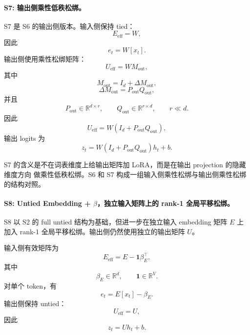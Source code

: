 \paragraph{S7: 输出侧乘性低秩松绑。}
S7 是 S6 的输出侧版本。输入侧保持 tied：
\begin{equation}
    E_{\mathrm{eff}} = W,
\end{equation}
因此
\begin{equation}
    e_t = W[x_t].
\end{equation}
输出侧使用乘性松绑矩阵：
\begin{equation}
    U_{\mathrm{eff}} = W M_{\mathrm{out}},
\end{equation}
其中
\begin{equation}
    M_{\mathrm{out}} = I_d + \Delta M_{\mathrm{out}},
\end{equation}
\begin{equation}
    \Delta M_{\mathrm{out}} = P_{\mathrm{out}}Q_{\mathrm{out}},
\end{equation}
并且
\begin{equation}
    P_{\mathrm{out}} \in \mathbb{R}^{d \times r}, \qquad
    Q_{\mathrm{out}} \in \mathbb{R}^{r \times d}, \qquad
    r \ll d.
\end{equation}
因此
\begin{equation}
    U_{\mathrm{eff}} =
    W(I_d + P_{\mathrm{out}}Q_{\mathrm{out}}),
\end{equation}
输出 logits 为
\begin{equation}
    z_t =
    W(I_d + P_{\mathrm{out}}Q_{\mathrm{out}})h_t + b.
\end{equation}

S7 的含义是不在词表维度上给输出矩阵加 LoRA，而是在输出 projection 的隐藏维度方向
做乘性低秩松绑。S6 和 S7 构成一组输入侧乘性松绑与输出侧乘性松绑的结构对照。

\paragraph{S8: Untied Embedding + $\beta$，独立输入矩阵上的 rank-1 全局平移松绑。}
S8 以 S2 的 full untied 结构为基础，但进一步在独立输入 embedding 矩阵 $E$ 上加入
rank-1 全局平移松绑。输出侧仍然使用独立的输出矩阵 $U$。

输入侧有效矩阵为
\begin{equation}
    E_{\mathrm{eff}} = E - \mathbf{1}\beta_E^\top,
\end{equation}
其中
\begin{equation}
    \beta_E \in \mathbb{R}^{d}, \qquad
    \mathbf{1} \in \mathbb{R}^{V}.
\end{equation}
对单个 token，有
\begin{equation}
    e_t = E[x_t] - \beta_E.
\end{equation}
输出侧保持 untied：
\begin{equation}
    U_{\mathrm{eff}} = U,
\end{equation}
因此
\begin{equation}
    z_t = U h_t + b.
\end{equation}

